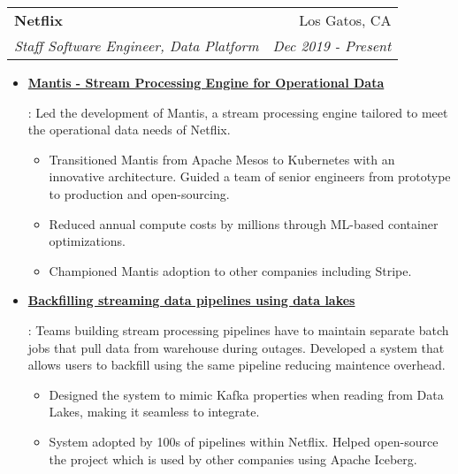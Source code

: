 \documentclass[letterpaper,11pt]{article}
\makeatletter
\newcommand{\resumeItem}[2]{
  \item\small{
    \textbf{#1}{: #2 \vspace{-2pt}}
  }
}
\newcommand{\resumeSubheading}[4]{
  \vspace{-1pt}\item
    \begin{tabular*}{0.97\textwidth}[t]{l@{\extracolsep{\fill}}r}
      \textbf{#1} & #2 \\
      \textit{\small#3} & \textit{\small #4} \\
    \end{tabular*}\vspace{-5pt}
}
\newcommand{\resumeSubSubheading}[2]{
    \begin{tabular*}{0.97\textwidth}{l@{\extracolsep{\fill}}r}
      \textit{\small#1} & \textit{\small #2} \\
    \end{tabular*}\vspace{-5pt}
}
\newcommand{\resumeItemListStart}{\begin{itemize}}
\newcommand{\resumeItemListEnd}{\end{itemize}}
\makeatother
\begin{document}
\resumeSubheading
{Netflix}{Los Gatos, CA}
{Staff Software Engineer, Data Platform}{Dec 2019 - Present}
\resumeItemListStart
\resumeItem{\href{https://www.sundaram.io/slides/mantis.pdf}{Mantis - Stream Processing Engine for Operational Data}}
{
  Led the development of Mantis, a stream processing engine tailored to meet the operational data needs of Netflix.
  \begin{itemize}[label=\textbf{--}]
    \item
          Transitioned Mantis from Apache Mesos to Kubernetes with an innovative architecture.
          Guided a team of senior engineers from prototype to production and open-sourcing.
    \item
          Reduced annual compute costs by millions through ML-based container optimizations.
    \item
          Championed Mantis adoption to other companies including Stripe.
  \end{itemize}
}
\resumeItem{\href{https://www.youtube.com/watch?v=tB4rx_W9Xqw}{Backfilling streaming data pipelines using data lakes}}
{
  Teams building stream processing pipelines have to maintain separate batch jobs that pull data from warehouse during outages.
  Developed a system that allows users to backfill using the same pipeline reducing maintence overhead.
  \begin{itemize}[label=\textbf{--}]
    \item
          Designed the system to mimic Kafka properties when reading from Data Lakes, making it seamless to integrate.
    \item
          System adopted by 100s of pipelines within Netflix. Helped open-source the project which is used by other companies using Apache Iceberg.
  \end{itemize}
}
\resumeItemListEnd


\end{document}
